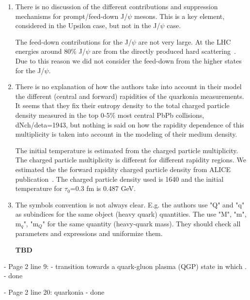 \documentclass[a4paper,11pt]{article}
\begin{document}
\begin{enumerate}

\item There is no discussion of the different contributions and suppression 
mechanisms for prompt/feed-down J/$\psi$ mesons. This is a key element, considered 
in the Upsilon case, but not in the J/$\psi$ case.

{\color{red} The feed-down contributions for the J/$\psi$ are not very large.
  At the LHC energies around 80\% J/$\psi$ are from the directly produced hard
  scattering~\cite{Lansberg:2019adr}. Due to this reason we did not consider the feed-down
  from the higher states for the J/$\psi$.
} 




\item There is no explanation of how the authors take into account in their model 
the different (central and forward) rapidities of the quarkonia measurements. 
It seems that they fix their entropy density to the total charged particle density 
measured in the top 0-5$\%$ most central PbPb collisions, dNch/deta=1943, but 
nothing is said on how the rapidity dependence of this multiplicity is 
taken into account in the modeling of their medium density. 

{ \color{red} The initial temperature is estimated from the charged particle
  multiplicity. The charged particle multiplicity is different for different
  rapidity regions. We estimated the the forward rapidity charged particle density
  from ALICE publication~\cite{Adam:2016ddh}. The charged particle density used is
  1640 and the initial temperature for $\tau_0$=0.3 fm is 0.487 GeV.
}

\item The symbols convention is not always clear. E.g. the authors use "Q" and 
"q" as subindices for the same object (heavy quark) quantities. The use "M", 
"m", m$_q$", "m$_Q$" for the same quantity (heavy-quark mass). They should check 
all parameters and expressions and uniformize them. 

{ \color{red} \textbf{TBD}
  
}
\end{enumerate}


- Page 2 line 9: - transition towards a quark-gluon plasma (QGP) state in which . \newline 
- {\color{blue} done} \newline

- Page 2 line 20: quarkonia \newline
- {\color{blue} done} \newline
\end{document}

